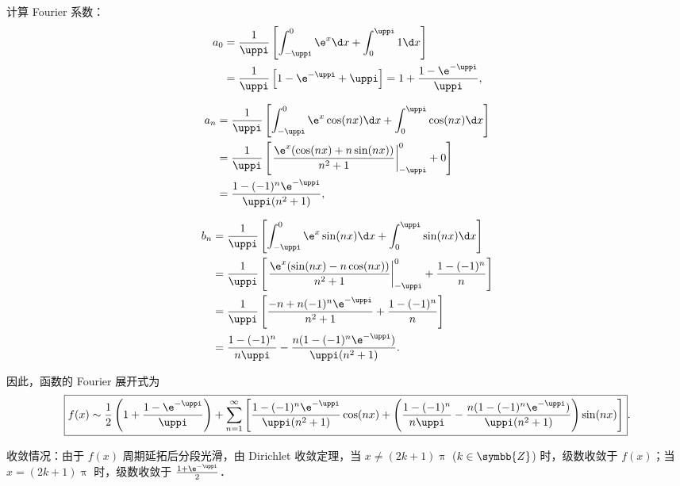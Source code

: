 \begin{solution}
    计算 Fourier 系数：
    \begin{equation}
        \begin{aligned}
            a_0 & = \frac{1}{\uppi} \left[ \int_{-\uppi}^{0} \e^x \d x + \int_{0}^{\uppi} 1 \d x \right]        \\
                & = \frac{1}{\uppi} \left[ 1 - \e^{-\uppi} + \uppi \right] = 1 + \frac{1 - \e^{-\uppi}}{\uppi},
        \end{aligned}
    \end{equation}

    \begin{equation}
        \begin{aligned}
            a_n & = \frac{1}{\uppi} \left[ \int_{-\uppi}^{0} \e^x \cos(nx) \d x + \int_{0}^{\uppi} \cos(nx) \d x \right]        \\
                & = \frac{1}{\uppi} \left[ \left. \frac{\e^x (\cos(nx) + n \sin(nx))}{n^2 + 1} \right|_{-\uppi}^{0} + 0 \right] \\
                & = \frac{1 - (-1)^n \e^{-\uppi}}{\uppi (n^2 + 1)},
        \end{aligned}
    \end{equation}

    \begin{equation}
        \begin{aligned}
            b_n & = \frac{1}{\uppi} \left[ \int_{-\uppi}^{0} \e^x \sin(nx) \d x + \int_{0}^{\uppi} \sin(nx) \d x \right]                           \\
                & = \frac{1}{\uppi} \left[ \left. \frac{\e^x (\sin(nx) - n \cos(nx))}{n^2 + 1} \right|_{-\uppi}^{0} + \frac{1 - (-1)^n}{n} \right] \\
                & = \frac{1}{\uppi} \left[ \frac{-n + n(-1)^n \e^{-\uppi}}{n^2 + 1} + \frac{1 - (-1)^n}{n} \right]                                 \\
                & = \frac{1 - (-1)^n}{n \uppi} - \frac{n(1 - (-1)^n \e^{-\uppi})}{\uppi (n^2 + 1)}.
        \end{aligned}
    \end{equation}

    因此，函数的 Fourier 展开式为
    \begin{equation}
        \boxed{f(x) \sim \frac{1}{2} \left( 1 + \frac{1 - \e^{-\uppi}}{\uppi} \right) + \sum_{n=1}^{\infty} \left[ \frac{1 - (-1)^n \e^{-\uppi}}{\uppi (n^2 + 1)} \cos(nx) + \left( \frac{1 - (-1)^n}{n \uppi} - \frac{n(1 - (-1)^n \e^{-\uppi})}{\uppi (n^2 + 1)} \right) \sin(nx) \right]}.
    \end{equation}

    收敛情况：由于 $f(x)$ 周期延拓后分段光滑，由 Dirichlet 收敛定理，当 $x \neq (2k+1)\uppi$ ($k \in \symbb{Z}$) 时，级数收敛于 $f(x)$；当 $x = (2k+1)\uppi$ 时，级数收敛于 $\frac{1 + \e^{-\uppi}}{2}$．
\end{solution}

